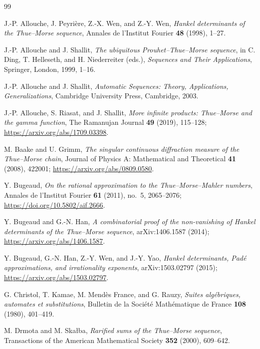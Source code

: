 \documentclass[11pt,oneside]{article}
\theoremstyle{definition}
\theoremstyle{remark}
\begin{document}
\begin{thebibliography}{99}

J.-P. Allouche, J. Peyri\`ere, Z.-X. Wen, and Z.-Y. Wen,
\emph{Hankel determinants of the Thue--Morse sequence},
Annales de l'Institut Fourier \textbf{48} (1998), 1--27.

J.-P. Allouche and J. Shallit,
\emph{The ubiquitous Prouhet--Thue--Morse sequence},
in C. Ding, T. Helleseth, and H. Niederreiter (eds.),
\emph{Sequences and Their Applications}, Springer, London, 1999, 1--16.

J.-P. Allouche and J. Shallit,
\emph{Automatic Sequences: Theory, Applications, Generalizations},
Cambridge University Press, Cambridge, 2003.

J.-P. Allouche, S. Riasat, and J. Shallit,
\emph{More infinite products: Thue--Morse and the gamma function},
The Ramanujan Journal \textbf{49} (2019), 115--128;
\url{https://arxiv.org/abs/1709.03398}.

M. Baake and U. Grimm,
\emph{The singular continuous diffraction measure of the Thue--Morse chain},
Journal of Physics A: Mathematical and Theoretical \textbf{41} (2008), 422001;
\url{https://arxiv.org/abs/0809.0580}.

Y. Bugeaud,
\emph{On the rational approximation to the Thue--Morse--Mahler numbers},
Annales de l'Institut Fourier \textbf{61} (2011), no.~5, 2065--2076;
\url{https://doi.org/10.5802/aif.2666}.

Y. Bugeaud and G.-N. Han,
\emph{A combinatorial proof of the non-vanishing of Hankel determinants of the
Thue--Morse sequence},
arXiv:1406.1587 (2014);
\url{https://arxiv.org/abs/1406.1587}.

Y. Bugeaud, G.-N. Han, Z.-Y. Wen, and J.-Y. Yao,
\emph{Hankel determinants, Pad\'e approximations, and irrationality exponents},
arXiv:1503.02797 (2015);
\url{https://arxiv.org/abs/1503.02797}.

G. Christol, T. Kamae, M. Mend\`es France, and G. Rauzy,
\emph{Suites alg\'ebriques, automates et substitutions},
Bulletin de la Soci\'et\'e Math\'ematique de France \textbf{108} (1980), 401--419.

M. Drmota and M. Ska\l ba,
\emph{Rarified sums of the Thue--Morse sequence},
Transactions of the American Mathematical Society \textbf{352} (2000), 609--642.


\end{thebibliography}
\end{document}
